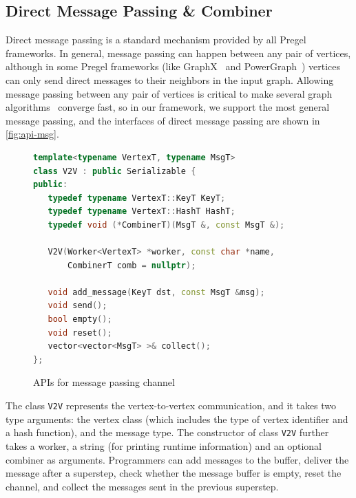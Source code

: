\documentclass{sokendai_thesis} %
\begin{document}

\subsection{Direct Message Passing \& Combiner}

Direct message passing is a standard mechanism provided by all Pregel frameworks.
In general, message passing can happen between any pair of vertices, although in some Pregel frameworks (like GraphX~\cite{graphx} and PowerGraph~\cite{powergraph}) vertices can only send direct messages to their neighbors in the input graph.
Allowing message passing between any pair of vertices is critical to make several graph algorithms~\cite{connectivity, effective} converge fast,
so in our framework, we support the most general message passing, and the interfaces of direct message passing are shown in \autoref{fig:api-msg}.

\begin{figure}[ht]
\centering
\vspace{-2ex}
\begin{lstlisting}[basicstyle=\small\ttfamily,
numbers=none,language=c++,xleftmargin=0.1\textwidth]
template<typename VertexT, typename MsgT>
class V2V : public Serializable {
public:
   typedef typename VertexT::KeyT KeyT;
   typedef typename VertexT::HashT HashT;
   typedef void (*CombinerT)(MsgT &, const MsgT &);

   V2V(Worker<VertexT> *worker, const char *name,
       CombinerT comb = nullptr);

   void add_message(KeyT dst, const MsgT &msg);
   void send();
   bool empty();
   void reset();
   vector<vector<MsgT> >& collect();
};
\end{lstlisting}
\vspace{-2ex}
\caption{APIs for message passing channel}
\label{fig:api-msg}
\end{figure}

The class \texttt{V2V} represents the vertex-to-vertex communication, and it takes two type arguments: the vertex class (which includes the type of vertex identifier and a hash function), and the message type.
The constructor of class \texttt{V2V} further takes a worker, a string (for printing runtime information) and an optional combiner as arguments.
Programmers can add messages to the buffer, deliver the message after a superstep, check whether the message buffer is empty, reset the channel, and collect the messages sent in the previous superstep.
\end{document}
